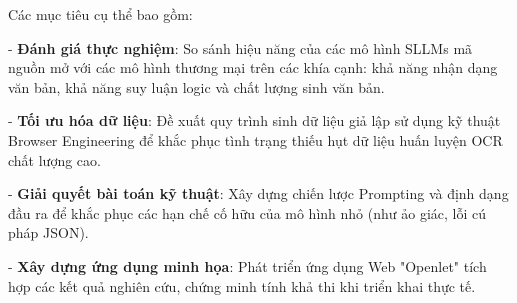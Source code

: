 Các mục tiêu cụ thể bao gồm:

- \textbf{Đánh giá thực nghiệm}: So sánh hiệu năng của các mô hình SLLMs mã nguồn
mở với các mô hình thương mại trên các khía cạnh: khả năng nhận dạng văn bản, khả
năng suy luận logic và chất lượng sinh văn bản.

- \textbf{Tối ưu hóa dữ liệu}: Đề xuất quy trình sinh dữ liệu giả lập sử dụng kỹ
thuật Browser Engineering để khắc phục tình trạng thiếu hụt dữ liệu huấn luyện OCR
chất lượng cao.

- \textbf{Giải quyết bài toán kỹ thuật}: Xây dựng chiến lược Prompting và định dạng
đầu ra để khắc phục các hạn chế cố hữu của mô hình nhỏ (như ảo giác, lỗi cú pháp
JSON).

- \textbf{Xây dựng ứng dụng minh họa}: Phát triển ứng dụng Web "Openlet" tích
hợp các kết quả nghiên cứu, chứng minh tính khả thi khi triển khai thực tế.